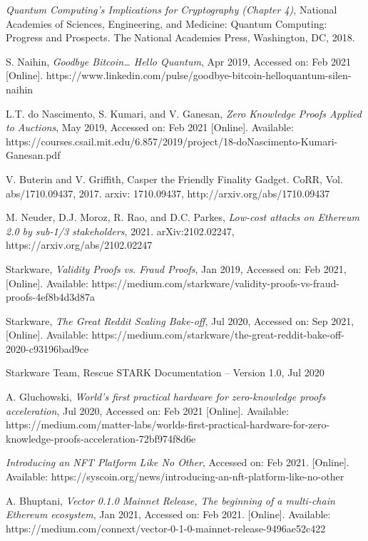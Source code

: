 \documentclass{ctexart}
\begin{document}
\begin{thebibliography}{00}
 \textit{Quantum Computing’s Implications for Cryptography (Chapter 4)}, National Academies of Sciences, Engineering, and Medicine: Quantum Computing: Progress and Prospects. The National Academies Press, Washington, DC, 2018.

 S. Naihin, \textit{Goodbye Bitcoin… Hello Quantum}, Apr 2019, Accessed on: Feb 2021 [Online].   https://www.linkedin.com/pulse/goodbye-bitcoin-helloquantum-silen-naihin

 L.T. do Nascimento, S. Kumari, and V. Ganesan, \textit{Zero Knowledge Proofs Applied to Auctions}, May 2019, Accessed on: Feb 2021 [Online].   Available: https://courses.csail.mit.edu/6.857/2019/project/18-doNascimento-Kumari-Ganesan.pdf

 V. Buterin and V. Griffith, Casper the Friendly Finality Gadget. CoRR, Vol. abs/1710.09437, 2017. arxiv: 1710.09437, http://arxiv.org/abs/1710.09437

 M. Neuder, D.J. Moroz, R. Rao, and D.C. Parkes, \textit{Low-cost attacks on Ethereum 2.0 by sub-1/3 stakeholders}, 2021. arXiv:2102.02247,  https://arxiv.org/abs/2102.02247

 Starkware, \textit{Validity Proofs vs. Fraud Proofs}, Jan 2019, Accessed on: Feb 2021, [Online]. Available: https://medium.com/starkware/validity-proofs-vs-fraud-proofs-4ef8b4d3d87a

 Starkware, \textit{The Great Reddit Scaling Bake-off}, Jul 2020, Accessed on: Sep 2021, [Online]. Available: https://medium.com/starkware/the-great-reddit-bake-off-2020-c93196bad9ce

  Starkware Team, Rescue STARK Documentation – Version 1.0, Jul 2020

 A. Gluchowski, \textit{World’s first practical hardware for zero-knowledge proofs acceleration}, Jul 2020, Accessed on: Feb 2021 [Online]. Available:  https://medium.com/matter-labs/worlds-first-practical-hardware-for-zero-knowledge-proofs-acceleration-72bf974f8d6e

  \textit{Introducing an NFT Platform Like No Other}, Accessed on: Feb 2021. [Online]. Available: https://syscoin.org/news/introducing-an-nft-platform-like-no-other

 A. Bhuptani, \textit{Vector 0.1.0 Mainnet Release, The beginning of a multi-chain Ethereum ecosystem}, Jan 2021, Accessed on: Feb 2021.  [Online]. Available:  https://medium.com/connext/vector-0-1-0-mainnet-release-9496ae52c422


\end{thebibliography}
\end{document}

